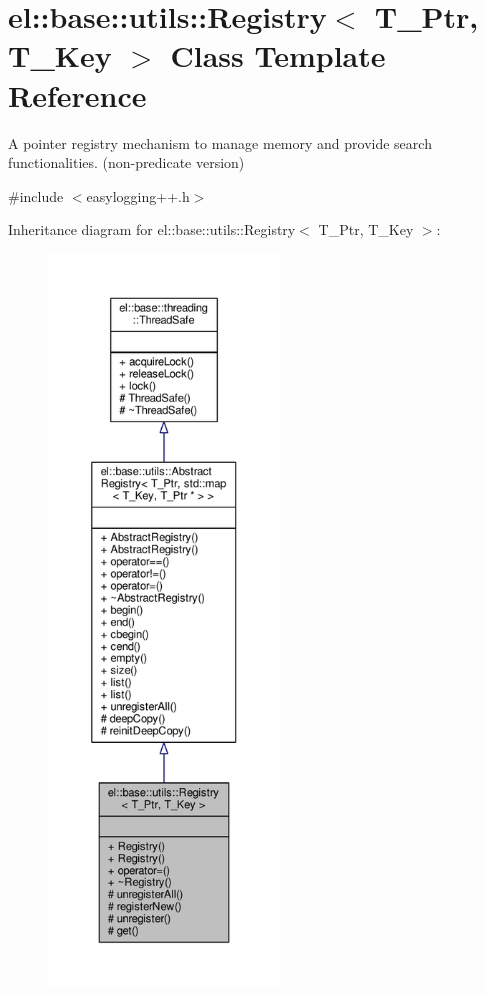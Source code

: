 \hypertarget{classel_1_1base_1_1utils_1_1Registry}{}\section{el\+:\+:base\+:\+:utils\+:\+:Registry$<$ T\+\_\+\+Ptr, T\+\_\+\+Key $>$ Class Template Reference}
\label{classel_1_1base_1_1utils_1_1Registry}


A pointer registry mechanism to manage memory and provide search functionalities. (non-\/predicate version)  




{\ttfamily \#include $<$easylogging++.\+h$>$}



Inheritance diagram for el\+:\+:base\+:\+:utils\+:\+:Registry$<$ T\+\_\+\+Ptr, T\+\_\+\+Key $>$\+:
\nopagebreak
\begin{figure}[H]
\begin{center}
\leavevmode
\includegraphics[height=550pt]{da/da8/classel_1_1base_1_1utils_1_1Registry__inherit__graph}
\end{center}
\end{figure}


